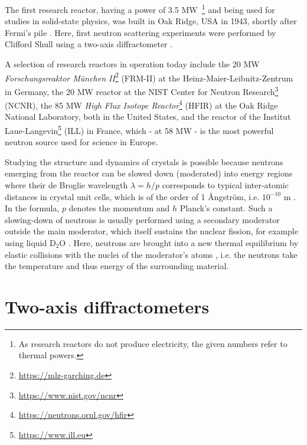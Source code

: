 The first research reactor, having a power of 3.5 MW~\footnote{As research reactors do not produce electricity, the given numbers refer to thermal powers.} and being used for studies in solid-state physics, was built in Oak Ridge, USA in 1943, shortly after Fermi's pile \cite[p. 3]{Jacrot2021}. 
Here, first neutron scattering experiments were performed by Clifford Shull using a two-axis diffractometer \cite[pp. 3, 37]{Jacrot2021}.

A selection of research reactors in operation today include the 20 MW \textit{Forschungsreaktor M\"unchen II}\footnote{\url{https://mlz-garching.de}} (FRM-II) at the Heinz-Maier-Leibnitz-Zentrum in Germany, the 20 MW reactor at the NIST Center for Neutron Research\footnote{\url{https://www.nist.gov/ncnr}} (NCNR), the 85 MW \textit{High Flux Isotope Reactor}\footnote{\url{https://neutrons.ornl.gov/hfir}} (HFIR) at the Oak Ridge National Laboratory, both in the United States, and the reactor of the Institut Laue-Langevin\footnote{\url{https://www.ill.eu}} (ILL) in France, which - at 58 MW - is the most powerful neutron source used for science in Europe.

Studying the structure and dynamics of crystals is possible because neutrons emerging from the reactor can be slowed down (moderated) into energy regions where their de Broglie wavelength $\lambda = h/p$ corresponds to typical inter-atomic distances in crystal unit cells, which is of the order of 1 \AA{}ngstr\"om, i.e. $10^{-10}$ m \cite[pp.1,3]{Squires2012}. In the formula, $p$ denotes the momentum and $h$ Planck's constant. Such a slowing-down of neutrons is usually performed using a secondary moderator outside the main moderator, which itself sustains the nuclear fission, for example using liquid $\mathrm{D_2O}$ \cite[p. 82]{Jacrot2021}. Here, neutrons are brought into a new thermal equilibrium by elastic collisions with the nuclei of the moderator's atoms \cite[p. 30]{Stacey2007}, i.e. the neutrons take the temperature and thus energy of the surrounding material.



\section{Two-axis diffractometers \label{sec:diff}}

